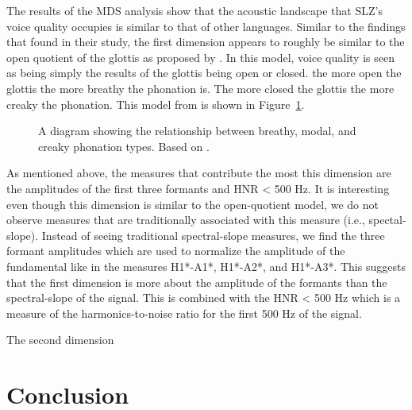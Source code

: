 The results of the MDS analysis show that the acoustic landscape that SLZ's voice quality occupies is similar to that of other languages. Similar to the findings that \citet{keatingCrosslanguageAcousticSpace2023} found in their study, the first dimension appears to roughly be similar to the open quotient of the glottis as proposed by \citet{gordonPhonationTypesCrosslinguistic2001}. In  this model, voice quality is seen as being simply the results of the glottis being open or closed. the more open the glottis the more breathy the phonation is. The more closed the glottis the more creaky the phonation. This model from \citet{gordonPhonationTypesCrosslinguistic2001} is shown in Figure~\ref{fig:phonation_types}. 

\begin{figure}[h!]
    \centering
    \caption{A diagram showing the relationship between breathy, modal, and creaky phonation types. Based on \citet{gordonPhonationTypesCrosslinguistic2001}.}
    \label{fig:phonation_types}
\end{figure}

As mentioned above, the measures that contribute the most this dimension are the amplitudes of the first three formants and HNR < 500 Hz. It is interesting even though this dimension is similar to the open-quotient model, we do not observe measures that are traditionally associated with this measure (i.e., spectal-slope). Instead of seeing traditional spectral-slope measures, we find the three formant amplitudes which are used to normalize the amplitude of the fundamental like in the measures H1*-A1*, H1*-A2*, and H1*-A3*. This suggests that the first dimension is more about the amplitude of the formants than the spectral-slope of the signal. This is combined with the HNR < 500 Hz which is a measure of the harmonics-to-noise ratio for the first 500 Hz of the signal. 

The second dimension 
\section{Conclusion} \label{sec:acousticlandscape:conclusion}
